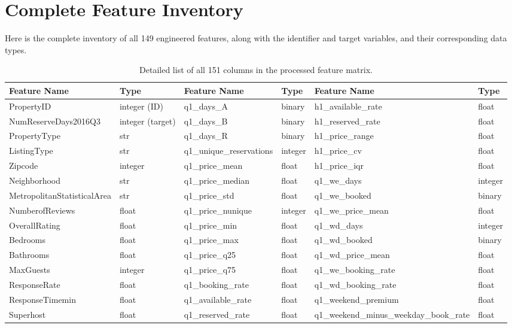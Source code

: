 \documentclass[journal]{IEEEtran}
\begin{document}
\section{Complete Feature Inventory}
\label{app:allfeatures_table}
Here is the complete inventory of all 149 engineered features, along with the identifier and target variables, and their corresponding data types.

\begin{table}[!ht]
\caption{Detailed list of all 151 columns in the processed feature matrix.}
\label{tab:allfeatures_list}
\centering
\footnotesize
\begin{tabular}{ll|ll|ll}
\toprule
Feature Name & Type & Feature Name & Type & Feature Name & Type \\
\midrule
PropertyID & integer (ID) & q1\_days\_A & binary & h1\_available\_rate & float \\
NumReserveDays2016Q3 & integer (target) & q1\_days\_B & binary & h1\_reserved\_rate & float \\
PropertyType & str & q1\_days\_R & binary & h1\_price\_range & float \\
ListingType & str & q1\_unique\_reservations & integer & h1\_price\_cv & float \\
Zipcode & integer & q1\_price\_mean & float & h1\_price\_iqr & float \\
Neighborhood & str & q1\_price\_median & float & q1\_we\_days & integer \\
MetropolitanStatisticalArea & str & q1\_price\_std & float & q1\_we\_booked & binary \\
NumberofReviews & float & q1\_price\_nunique & integer & q1\_we\_price\_mean & float \\
OverallRating & float & q1\_price\_min & float & q1\_wd\_days & integer \\
Bedrooms & float & q1\_price\_max & float & q1\_wd\_booked & binary \\
Bathrooms & float & q1\_price\_q25 & float & q1\_wd\_price\_mean & float \\
MaxGuests & integer & q1\_price\_q75 & float & q1\_we\_booking\_rate & float \\
ResponseRate & float & q1\_booking\_rate & float & q1\_wd\_booking\_rate & float \\
ResponseTimemin & float & q1\_available\_rate & float & q1\_weekend\_premium & float \\
Superhost & float & q1\_reserved\_rate & float & q1\_weekend\_minus\_weekday\_book\_rate & float \\

\end{tabular}
\end{table}
\end{document}
